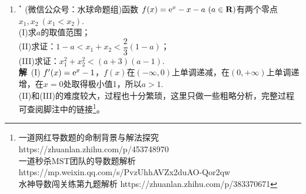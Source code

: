 \begin{enumerate}[label={【\textbf{例\thechapter.\arabic*}】},
 leftmargin=\inteval{\myenumleftmargin}pt,
 itemsep=\inteval{\myenumitempsep}pt,
 itemindent=\inteval{\myenumitemindent}pt]
根据不等式(\ref{2(t-1)/(t+1)<lnt})和(\ref{2(t-1)/(t+1)>lnt})，
\begin{gather}
 m=X_1-\ln X_1>X_1-\dfrac{2(X_1-1)}{X_1+1}=\dfrac{X_1^2-X_1+2}{X_1+1} 
\label{Pade逼近对X_1的范围估计} \\
 m=X_2-\ln X_2<X_2-\dfrac{2(X_2-1)}{X_2+1}=\dfrac{X_2^2-X_2+2}{X_2+1} 
\label{Pade逼近对X_2的范围估计}	\\	
	 -m(X_1+1)<\ -X_1^2+X_1-2 \nonumber \\
	  m(X_2+1)<\ X_2^2-X_2+2 \nonumber
\end{gather}
以上两式相加可得：
\begin{gather*}
	m(X_2-X_1)<(X_2-X_1)(X_2+X_1-1)  \\
	m<X_2+X_1-1 \\
    X_1+X_2>m+1
\end{gather*}
前面也提到过，用$ \dfrac{X^2-X+2}{X+1} $作为$ X-\ln X $的近似替代，精度不如$ X-\ln X $的$ (2,1) $阶帕德逼近 $ \dfrac{3X^2-2X+5}{4X+2} $. \\
\textbf{推广2}\ 如果$ \alpha>0, 1<x_1<x_2 $，且$ \dfrac{\ln x_1}{x_1^{\alpha}}=
\dfrac{\ln x_2}{x_2^{\alpha}} $，那么有$ x_1 x_2>\e^{2/\alpha},\ \ln x_1+\ln x_2>\dfrac{2}{\alpha} $. 

\item $ ^* $ (微信公众号：水球命题组)函数
$ f(x)=\e^x-x-a \ (a\in \textbf{R}) $有两个零点$ x_1,x_2 \ (x_1<x_2) $.\\
(I)求$ a $的取值范围；\\
(II)求证：$ 1-a<x_1+x_2<\dfrac{2}{3}(1-a) $； \\
(III)求证：$ x_1^2+x_2^2<(a+3)(a-1) $. \\
\textbf{解}\ (I) $ f'(x)=\mathrm{e}^x-1 $，$ f(x) $在$ (-\infty,0) $上单调递减，在$ (0,+\infty) $上单调递增，在$ x=0 $处取得极小值1，所以$ a>1 $. \\
(II)和(III)的难度较大，过程也十分繁琐，这里只做一些粗略分析，完整过程可查阅脚注中的链接\footnote{
    一道网红导数题的命制背景与解法探究 https://zhuanlan.zhihu.com/p/453748970 \\
    一道秒杀MST团队的导数题解析 https://mp.weixin.qq.com/s/PvzUhhAVZx2duAO-Qor2qw \\
    水神导数闯关练第九题解析 https://zhuanlan.zhihu.com/p/383370671 }。


\end{enumerate}
